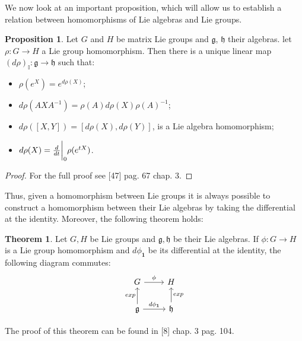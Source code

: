 \documentclass[12pt,a4paper]{report}
\theoremstyle{definition}
\theoremstyle{Theorem}
\newtheorem{Theo}[Def]{Theorem}
\newtheorem{Prop}[Def]{Proposition}
\theoremstyle{definition}
\theoremstyle{definition}
\begin{document}
	We now look at an important proposition, which will allow us to establish a relation between homomorphisms of Lie algebras and Lie groups.
	\begin{Prop} \label{Prop: 2.4.1}
		Let $G$ and $H$ be matrix Lie groups and $\mathfrak{g}$, $\mathfrak{h}$ their algebras. let $\rho:G\rightarrow H$ a Lie group homomorphism. Then there is a unique linear map $(d\rho)_\mathbb{I}:\mathfrak{g}\rightarrow\mathfrak{h}$ such that:
		\begin{itemize}
			\item $\rho(e^X)=e^{d\rho(X)}$; 
			\item $d\rho(AXA^{-1})=\rho(A)d\rho(X)\rho(A)^{-1}$;
			\item $d\rho([X,Y])=[d\rho(X),d\rho(Y)]$, is a Lie algebra homomorphism;
			\item $d\rho(X)={d\over dt}\bigg{\rvert}_0\rho(e^{tX})$.
		\end{itemize}
	\end{Prop}
	\begin{proof}
		For the full proof see [47] pag. 67 chap. 3.
	\end{proof}
	Thus, given a homomorphism between Lie groups it is always possible to construct a homomorphism between their Lie algebras by taking the differential at the identity. Moreover, the following theorem holds:
	\begin{Theo}
		Let $G,H$ be Lie groups and $\mathfrak{g},\mathfrak{h}$ be their Lie algebras. If $\phi:G\rightarrow H$ is a Lie group homomorphism and $d\phi_\textbf{1}$ be its differential at the identity, the following diagram commutes:\\
		\begin{equation*}
			\begin{tikzcd}
				G \arrow{r}{\phi} & H \\
				\mathfrak{g} \arrow{r}{d\phi_\textbf{1}} \arrow{u}{exp}& \mathfrak{h} \arrow[swap]{u}{exp} 
			\end{tikzcd}
		\end{equation*}
	\end{Theo}
	The proof of this theorem can be found in [8] chap. 3 pag. 104.
\end{document}
